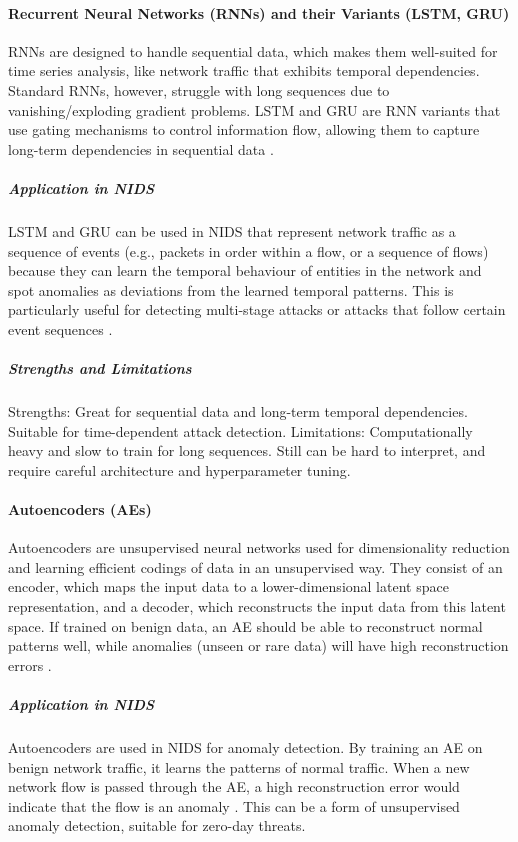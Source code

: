 \paragraph{Recurrent Neural Networks (RNNs) and their Variants (LSTM, GRU)}
RNNs are designed to handle sequential data, which makes them well-suited for time series analysis, like network traffic that exhibits temporal dependencies. Standard RNNs, however, struggle with long sequences due to vanishing/exploding gradient problems. LSTM and GRU are RNN variants that use gating mechanisms to control information flow, allowing them to capture long-term dependencies in sequential data \parencite {zhao2022anomaly}.

\subparagraph{Application in NIDS} 
LSTM and GRU can be used in NIDS that represent network traffic as a sequence of events (e.g., packets in order within a flow, or a sequence of flows) because they can learn the temporal behaviour of entities in the network and spot anomalies as deviations from the learned temporal patterns. This is particularly useful for detecting multi-stage attacks or attacks that follow certain event sequences \parencite {yin2023intrusion}.

\subparagraph{Strengths and Limitations} 
Strengths: Great for sequential data and long-term temporal dependencies. Suitable for time-dependent attack detection. 
Limitations: Computationally heavy and slow to train for long sequences. Still can be hard to interpret, and require careful architecture and hyperparameter tuning.

\paragraph{Autoencoders (AEs)} 
Autoencoders are unsupervised neural networks used for dimensionality reduction and learning efficient codings of data in an unsupervised way. They consist of an encoder, which maps the input data to a lower-dimensional latent space representation, and a decoder, which reconstructs the input data from this latent space. If trained on benign data, an AE should be able to reconstruct normal patterns well, while anomalies (unseen or rare data) will have high reconstruction errors \parencite {bendre2023comprehensive}.

\subparagraph{Application in NIDS} 
Autoencoders are used in NIDS for anomaly detection. By training an AE on benign network traffic, it learns the patterns of normal traffic. When a new network flow is passed through the AE, a high reconstruction error would indicate that the flow is an anomaly \parencite {bendre2023comprehensive}. This can be a form of unsupervised anomaly detection, suitable for zero-day threats.

